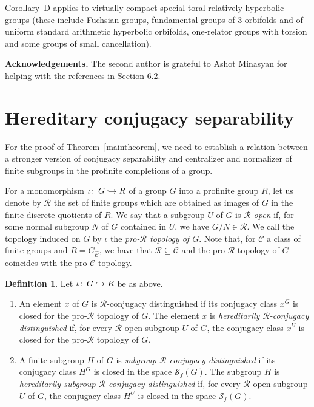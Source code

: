 \documentclass[12pt,twoside]{amsart}
\newcommand\cR{{\mathcal R}}
\newcommand\hookra{\hookrightarrow}
\newcommand\cC{{\mathscr C}}
\newcommand\cS{{\mathscr S}}
\def\co{\colon\thinspace}
\def\wC{{\widehat{\cC}}}
\theoremstyle{definition}
\newtheorem{definition}[theorem]{Definition}
\begin{document}
Corollary~D  applies to virtually compact special toral relatively hyperbolic groups (these include Fuchsian groups, 
fundamental groups of $3$-orbifolds and of uniform standard arithmetic hyperbolic orbifolds,  one-relator groups with torsion 
and some groups of small cancellation). 
\bigskip

\noindent
{\bf Acknowledgements.} The second author is grateful to Ashot Minasyan for helping with the references in Section 6.2.








\section{Hereditary conjugacy separability}
For the proof of Theorem~\ref{maintheorem}, we need to establish a relation between a stronger version of conjugacy
separability and centralizer and normalizer of finite subgroups in the profinite completions of a group. 

For a monomorphism $\iota\co G\hookra R$ of a group $G$ into a profinite group $R$, let us denote by $\cR$ the set of finite groups
which are obtained as images of $G$ in the finite discrete quotients of $R$. We say that a subgroup $U$ of $G$ is \emph{$\cR$-open} 
if, for some normal subgroup $N$ of $G$ contained in $U$, we have $G/N\in\cR$. We call the topology induced on $G$ by $\iota$ the 
\emph{pro-$\cR$ topology of $G$}. Note that, for $\cC$ a class of finite groups and $R=G_\wC$, we have that $\cR\subseteq\cC$ 
and the pro-$\cR$ topology of $G$ coincides with the pro-$\cC$ topology.

\begin{definition}\label{distconjsep}Let $\iota\co G\hookra R$ be as above.
\begin{enumerate}
\item An element $x$ of $G$ is $\cR$-conjugacy distinguished if its conjugacy class $x^G$ is closed for the pro-$\cR$ topology of $G$. 
The element $x$ is \emph{hereditarily $\cR$-conjugacy distinguished} if, for every $\cR$-open subgroup $U$ 
of $G$, the conjugacy class $x^U$ is closed for the pro-$\cR$ topology of $G$. 
\item A finite subgroup $H$ of $G$ is \emph{subgroup $\cR$-conjugacy distinguished} if its conjugacy class $H^G$ is closed in the space $\cS_f(G)$.
The subgroup $H$ is \emph{hereditarily subgroup $\cR$-conjugacy distinguished} if, for every $\cR$-open subgroup $U$ 
of $G$, the conjugacy class $H^U$ is closed in the space $\cS_f(G)$.
\end{enumerate}
\end{definition}
\end{document}
